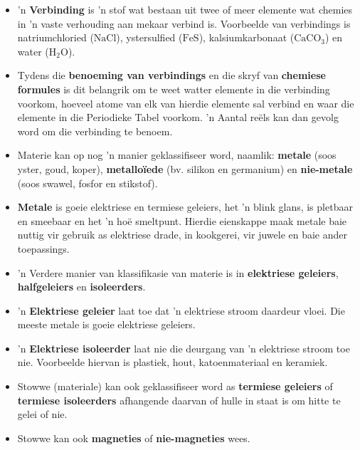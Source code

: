 \begin{itemize}[noitemsep]
     \item 'n \textbf{Verbinding} is 'n stof wat bestaan uit twee of meer elemente wat chemies
in 'n vaste verhouding aan mekaar verbind is. Voorbeelde van verbindings is natriumchloried ($\text{NaCl}$),
ystersulfied ($\text{FeS}$), kalsiumkarbonaat (${\text{CaCO}}_{3}$) en water (${\text{H}}_{2}\text{O}$).
     \item Tydens die \textbf{benoeming van verbindings} en die skryf van \textbf{chemiese formules} is dit belangrik om  te weet watter elemente in die verbinding voorkom, hoeveel atome van elk van hierdie elemente sal verbind en waar die elemente in die Periodieke Tabel voorkom. 'n Aantal re\"els kan dan gevolg word om die verbinding te benoem.
     \item Materie kan op nog 'n manier geklassifiseer word, naamlik: \textbf{metale} (soos yster, goud, koper), \textbf{metallo\"iede} (bv. silikon en germanium) en \textbf{nie-metale} (soos swawel, fosfor en stikstof).
     \item \textbf{Metale} is goeie elektriese en termiese geleiers, het 'n blink glans, is pletbaar en smeebaar en het 'n ho\"e smeltpunt. Hierdie eienskappe maak metale baie nuttig vir gebruik as elektriese drade, in kookgerei, vir juwele en baie ander toepassings.
     \item 'n Verdere manier van klassifikasie van materie is in \textbf{elektriese geleiers}, \textbf{halfgeleiers} en \textbf{isoleerders}.
     \item 'n \textbf{Elektriese geleier} laat toe dat 'n elektriese stroom daardeur vloei. Die meeste metale is goeie elektriese geleiers.
     \item 'n \textbf{Elektriese isoleerder} laat nie die deurgang van 'n elektriese stroom toe nie. Voorbeelde hiervan is plastiek, hout, katoenmateriaal en keramiek.
     \item Stowwe (materiale) kan ook geklassifiseer word as \textbf{termiese geleiers} of \textbf{termiese isoleerders} afhangende daarvan of hulle in staat is om hitte te gelei of nie.
     \item Stowwe kan ook \textbf{magneties} of \textbf{nie-magneties} wees.
\end{itemize} \pagebreak

\label{m38706*secfhsst!!!underscore!!!id672}

